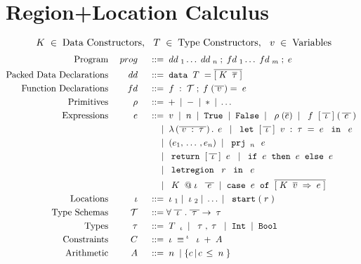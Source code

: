 \documentclass[12pt]{article}
\makeatletter
\newcommand{\gramdef}{\; ::= \;}
\newcommand{\gramor}{\; | \;}
\newcommand{\PROG}{\keywd{prog}}
\newcommand{\EXPR}{\keywd{e}}
\newcommand{\PRIM}{\keywd{\rho}}
\newcommand{\TYP}{\keywd{\tau}}
\newcommand{\STYP}{\keywd{\mathcal{T}}}
\newcommand{\DD}{\keywd{dd}}
\newcommand{\VD}{\keywd{vd}}
\newcommand{\FD}{\keywd{fd}}
\newcommand{\TC}{\keywd{T}}
\newcommand{\DC}{\keywd{K}}
\newcommand{\DATA}{\gramwd{data}}
\newcommand{\sTYP}{\skeywd{\tau}}
\newcommand{\sEXPR}{\skeywd{e}}
\newcommand{\skeywd}[1]{#1}
\newcommand{\keywd}[1]{\; {#1} \;}
\newcommand{\gramwd}[1]{\; \texttt{#1} \;}
\newcommand{\pairtype}[2]{\; {#1}, {#2} \;}
\newcommand{\case}[2]{\gramwd{case}\; #1\; \gramwd{of}\; #2 \;}
\newcommand{\bind}[2]{{#1} \Rightarrow {#2}}
\newcommand{\var}{\; \svar \;}
\newcommand{\svar}{v}
\newcommand{\fvar}{\; \sfvar \;}
\newcommand{\sfvar}{f}
\newcommand{\num}{\; n \;}
\newcommand{\primexpr}[1]{\; \PRIM(#1) \;}
\newcommand{\ife}[3]{\; \gramwd{if}#1\gramwd{then}#2\gramwd{else}#3 \;}
\newcommand{\mapp}[3]{\; #1\;[\,#2\,]\;(\,#3\,) \;}
\newcommand{\return}[2]{\; \gramwd{return}\;[\,#1\,]\;#2\;}
\newcommand{\project}[2]{\; \gramwd{prj}_{#1}\,{#2}\;}
\newcommand{\anonfun}[2]{\; \lambda\,(#1)\,.\,#2\;}
\newcommand{\letlexpr}[4]{\;\gramwd{let} \; [\,#1\,]\; #2 = #3 \; \gramwd{in} \; #3 \;}
\newcommand{\letregion}[2]{\; \gramwd{letregion}\;#1\; \gramwd{in}\; #2 \;}
\newcommand{\mkdata}[3]{\; #1\;#2\;\;#3 \;}
\newcommand{\LOC}{\keywd{\iota}}
\newcommand{\REG}{\keywd{r}}
\newcommand{\atloc}[1]{@#1}
\newcommand{\lstart}[1]{\; \gramwd{start}(#1) \;}
\newcommand{\CONSTR}{\keywd{C}}
\newcommand{\A}{\keywd{A}}
\makeatother
\begin{document}
\section{Region+Location Calculus}
\begin{displaymath}
    \DC \in \; \textup{Data Constructors}, \:\: \TC \in \; \textup{Type Constructors}, \:\: \var \in \; \textup{Variables}
\end{displaymath} 
\begin{displaymath}
  \begin{aligned}
      \textup{Program} && \PROG && \gramdef & \DD_1 \ldots \DD_n \; ; 
                          \FD_1 \ldots \FD_m \; ; \EXPR \\
      \textup{Packed Data Declarations} && \DD && \gramdef & \DATA \TC = \overline{[\DC \; \overline{\sTYP}\;]} \\    
      \textup{Function Declarations} && \FD && \gramdef & \fvar : \STYP ; \fvar(\overline{\var}) = \EXPR \\
      \textup{Primitives} && \PRIM && \gramdef & + \gramor - \gramor * \gramor \ldots \\
      \textup{Expressions} && \EXPR && \gramdef & \var \gramor \num \gramor \gramwd{True} \gramor \gramwd{False} \gramor
            \primexpr{\overline{\sEXPR}} \gramor \mapp{\fvar}{\overline{\LOC}}{\overline{\EXPR}} \\
      && && \gramor & \anonfun{\overline{\var : \TYP}}{\EXPR} \gramor \letlexpr{\overline{\LOC}}{\var:\TYP}{\EXPR}{\EXPR} \\
      && && \gramor & \;(e_1,\, \dots\, , e_n)\; \gramor \project{\num}{\EXPR} \\
      && && \gramor & \return{\overline{\LOC}}{\EXPR} \gramor \ife{\EXPR}{\EXPR}{\EXPR} \\
      && && \gramor & \letregion{\REG}{\EXPR} \\
      && && \gramor & \mkdata{\DC}{\atloc{\LOC}}{\overline{\EXPR}} \gramor \case{\sEXPR}{\overline{[\bind{\DC \; \overline{\svar} \;}{\EXPR}]}} \\
      \textup{Locations} && \LOC && \gramdef & \LOC_1 \gramor \LOC_2 \gramor \ldots \gramor \lstart{\REG} \\
      \textup{Type Schemas} && \STYP && \gramdef & \forall\;\overline{\LOC}\;.\;\overline{\TYP}\rightarrow\TYP \\
      \textup{Types} && \TYP && \gramdef & \TC_{\LOC} \gramor \pairtype{\TYP}{\TYP} \gramor \gramwd{Int} \gramor \gramwd{Bool} \\
      \textup{Constraints} && \CONSTR && \gramdef & \LOC \equiv^{\LOC} \LOC + \A \\
      \textup{Arithmetic} && \A && \gramdef & \num \gramor \{ c\, |\, c \, \leq \num \}
  \end{aligned}
\end{displaymath}
\end{document}
